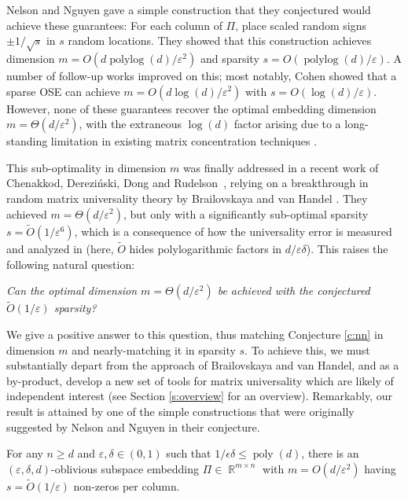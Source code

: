 \documentclass[11pt]{amsart}
\numberwithin{equation}{section}
\numberwithin{equation}{section}
\DeclareMathOperator{\R}{\mathbb{R}}
\DeclareMathOperator{\polylog}{polylog}
\DeclareMathOperator{\poly}{poly}
\theoremstyle{remark}
\theoremstyle{definition}
\begin{document}
Nelson and Nguyen gave a simple construction that they conjectured would achieve these guarantees: For each column of $\Pi$, place scaled random signs $\pm1/\sqrt s$ in $s$ random locations. They showed that this construction achieves dimension $m=O(d\polylog(d)/\varepsilon^2)$ and sparsity $s=O(\polylog(d)/\varepsilon)$. A number of follow-up works \cite{bourgain2015toward,cohen2016nearly} improved on this; most notably, Cohen \cite{cohen2016nearly} showed that a sparse OSE can achieve $m=O(d\log(d)/\varepsilon^2)$ with $s=O(\log(d)/\varepsilon)$. However, none of these guarantees recover the optimal embedding dimension $m=\Theta(d/\varepsilon^2)$, with the extraneous $\log(d)$ factor arising due to a long-standing limitation in existing matrix concentration techniques \cite{troppmatrixconc}. 

This sub-optimality in dimension $m$ was finally addressed in a recent work of Chenakkod, Derezi\'nski, Dong and Rudelson~\cite{chenakkod2024optimal}, relying on a breakthrough in random matrix universality theory by Brailovskaya and van Handel \cite{brailovskaya2022universality}. They achieved $m=\Theta(d/\varepsilon^2)$, but only with a significantly sub-optimal sparsity $s = \tilde O(1/\varepsilon^6)$, which is a consequence of how the universality error is measured and analyzed in \cite{brailovskaya2022universality} (here, $\tilde O$ hides polylogarithmic factors in $d/\varepsilon\delta$). This raises the following natural question: 

\smallskip

\textit{Can the optimal dimension $m=\Theta(d/\varepsilon^2)$ be achieved with the conjectured $\tilde O(1/\varepsilon)$ sparsity?}

\smallskip

We give a positive answer to this question, thus matching Conjecture \ref{c:nn} in dimension $m$ and nearly-matching it in sparsity $s$. To achieve this, we must substantially depart from the approach of Brailovskaya and van Handel, and as a by-product, develop a new set of tools for matrix universality
which are likely of independent interest (see Section \ref{s:overview} for an overview). Remarkably, our result is attained by one of the simple constructions that were originally suggested by Nelson and Nguyen in their conjecture.
\begin{theorem}\label{t:ose}
    For any $n\geq d$ and $\varepsilon,\delta\in(0,1)$ such that $1/\epsilon\delta \leq\poly(d)$, there is an $(\varepsilon,\delta,d)$-oblivious subspace embedding $\Pi\!\in\!\R^{m\times n}$ with $m=O(d/\varepsilon^2)$ having $s=\tilde O(1/\varepsilon)$ non-zeros per column.
\end{theorem}
\end{document}
